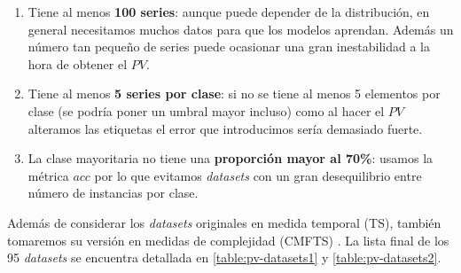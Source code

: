 \begin{enumerate}
  \item Tiene al menos \textbf{100 series}: aunque puede depender de la distribución, en general necesitamos muchos datos para que los modelos aprendan. Además un número tan pequeño de series puede ocasionar una gran inestabilidad a la hora de obtener el $PV$.
  \item Tiene al menos \textbf{5 series por clase}: si no se tiene al menos 5 elementos por clase (se podría poner un umbral mayor incluso) como al hacer el $PV$ alteramos las etiquetas el error que introducimos sería demasiado fuerte.
  \item La clase mayoritaria no tiene una \textbf{proporción mayor al 70\%}: usamos la métrica $acc$ por lo que evitamos \emph{datasets} con un gran desequilibrio entre número de instancias por clase.
\end{enumerate}

Además de considerar los \emph{datasets} originales en medida temporal (TS), también tomaremos su versión en medidas de complejidad (CMFTS) \cite{baldan2020complexity, baldan2020complexityugr}. La lista final de los 95 \emph{datasets} se encuentra detallada en \autoref{table:pv-datasets1} y \autoref{table:pv-datasets2}.

